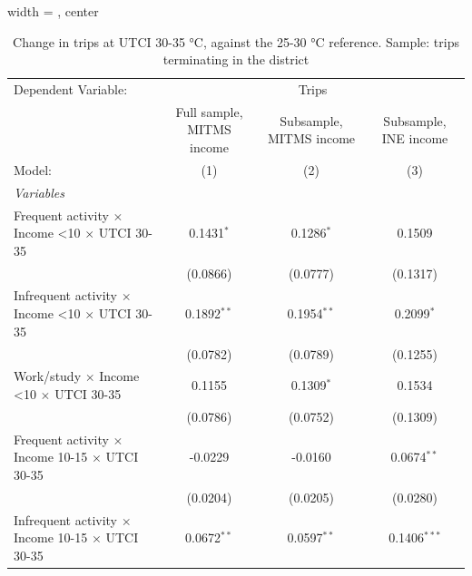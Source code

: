 
\begin{table}[htbp]
   \caption{\label{table_models_abc_terminating_30-35} Change in trips at UTCI 30-35 °C, against the 25-30 °C reference. Sample: trips terminating in the district}
   \centering
   \small
   \begin{adjustbox}{width = \textwidth, center}
      \begin{tabular}{lccc}
         \tabularnewline \midrule \midrule
         Dependent Variable: & \multicolumn{3}{c}{Trips}\\
                                                                         & Full sample, MITMS income & Subsample, MITMS income & Subsample, INE income \\   
         Model:                                                          & (1)                       & (2)                     & (3)\\  
         \midrule
         \emph{Variables}\\
         Frequent activity $\times$ Income <10 $\times$ UTCI 30-35       & 0.1431$^{*}$              & 0.1286$^{*}$            & 0.1509\\   
                                                                         & (0.0866)                  & (0.0777)                & (0.1317)\\   
         Infrequent activity $\times$ Income <10 $\times$ UTCI 30-35     & 0.1892$^{**}$             & 0.1954$^{**}$           & 0.2099$^{*}$\\   
                                                                         & (0.0782)                  & (0.0789)                & (0.1255)\\   
         Work/study $\times$ Income <10 $\times$ UTCI 30-35              & 0.1155                    & 0.1309$^{*}$            & 0.1534\\   
                                                                         & (0.0786)                  & (0.0752)                & (0.1309)\\   
         Frequent activity $\times$ Income 10-15 $\times$ UTCI 30-35     & -0.0229                   & -0.0160                 & 0.0674$^{**}$\\   
                                                                         & (0.0204)                  & (0.0205)                & (0.0280)\\   
         Infrequent activity $\times$ Income 10-15 $\times$ UTCI 30-35   & 0.0672$^{**}$             & 0.0597$^{**}$           & 0.1406$^{***}$\\   

\end{tabular}
\end{adjustbox}
\end{table}
